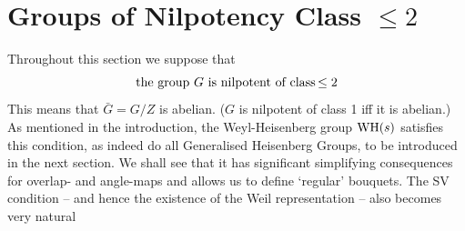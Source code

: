 \documentclass[12pt]{article}
\newcommand{\barG}{\ensuremath{\bar{G}}}
\begin{document}
\section{Groups of Nilpotency Class $\leq 2$}\label{sec: nilpotent groups}
Throughout this section we suppose that 
\begin{equation}\label{eq:nilpotent class 2 condit}
\mbox{the group $G$ is nilpotent of class\,$\leq 2$}
\end{equation} 
This means that $\barG=G/Z$ is abelian. ($G$ is nilpotent of class 1 iff it is abelian.) As mentioned in the introduction, the Weyl-Heisenberg group ${\rm WH}(s)$ satisfies this condition, as indeed do all Generalised Heisenberg Groups, to be introduced in the next section. We shall see that it has significant simplifying consequences for overlap- and angle-maps and allows us to define `regular' bouquets. The SV condition -- and hence the existence of the Weil representation -- also becomes very natural
\end{document}
